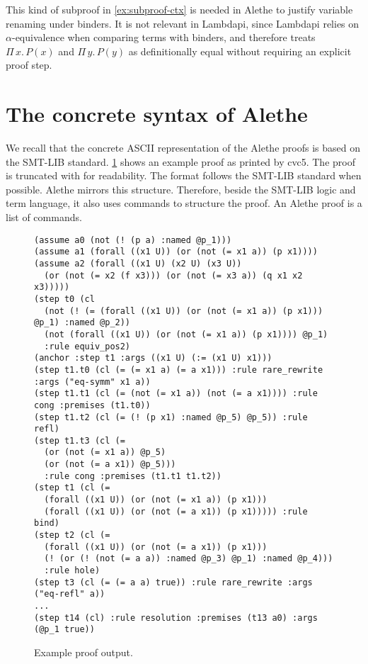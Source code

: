 \begin{remark}
This kind of subproof in \cref{ex:subproof-ctx} is needed in Alethe to justify variable renaming under binders.
It is not relevant in Lambdapi, since Lambdapi relies on $\alpha$-equivalence when comparing terms with binders,
and therefore treats $\Pi\,x.\,P(x)$ and $\Pi\,y.\,P(y)$ as definitionally equal without requiring an explicit proof step.
\end{remark}

\section{The concrete syntax of Alethe}

We recall that the concrete ASCII representation of the Alethe proofs is based on the SMT-LIB standard.
\cref{fig:syntax-alethe-example} shows an example proof as printed by cvc5. The proof is truncated with for readability.
The format follows the SMT-LIB standard when possible.
Alethe mirrors this structure. Therefore, beside the SMT-LIB logic and term language, it also uses commands to structure the proof.
An Alethe proof is a list of commands.

\begin{figure}
\begin{lstlisting}[language=SMT]
(assume a0 (not (! (p a) :named @p_1)))
(assume a1 (forall ((x1 U)) (or (not (= x1 a)) (p x1))))
(assume a2 (forall ((x1 U) (x2 U) (x3 U))
  (or (not (= x2 (f x3))) (or (not (= x3 a)) (q x1 x2 x3)))))
(step t0 (cl 
  (not (! (= (forall ((x1 U)) (or (not (= x1 a)) (p x1))) @p_1) :named @p_2))
  (not (forall ((x1 U)) (or (not (= x1 a)) (p x1)))) @p_1)
  :rule equiv_pos2)
(anchor :step t1 :args ((x1 U) (:= (x1 U) x1)))
(step t1.t0 (cl (= (= x1 a) (= a x1))) :rule rare_rewrite :args ("eq-symm" x1 a))
(step t1.t1 (cl (= (not (= x1 a)) (not (= a x1)))) :rule cong :premises (t1.t0))
(step t1.t2 (cl (= (! (p x1) :named @p_5) @p_5)) :rule refl)
(step t1.t3 (cl (= 
  (or (not (= x1 a)) @p_5)
  (or (not (= a x1)) @p_5)))
  :rule cong :premises (t1.t1 t1.t2))
(step t1 (cl (=
  (forall ((x1 U)) (or (not (= x1 a)) (p x1)))
  (forall ((x1 U)) (or (not (= a x1)) (p x1))))) :rule bind)
(step t2 (cl (= 
  (forall ((x1 U)) (or (not (= a x1)) (p x1)))
  (! (or (! (not (= a a)) :named @p_3) @p_1) :named @p_4)))
  :rule hole)
(step t3 (cl (= (= a a) true)) :rule rare_rewrite :args ("eq-refl" a))
...
(step t14 (cl) :rule resolution :premises (t13 a0) :args (@p_1 true))
\end{lstlisting}
\caption{Example proof output.}
\label{fig:syntax-alethe-example}
\end{figure}



